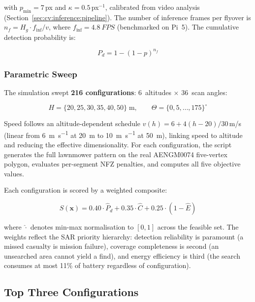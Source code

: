 \noindent with $p_{\mathrm{min}} = 7$\,px and $\kappa = 0.5$\,px$^{-1}$, calibrated from video analysis (Section~\ref{sec:cv:inference:pipeline}).
The number of inference frames per flyover is $n_f = H_g \cdot f_{\mathrm{inf}} / v$, where $f_{\mathrm{inf}} = \SI{4.8}{FPS}$ (benchmarked on Pi~5).
The cumulative detection probability is:

\begin{equation}\label{eq:opt-pdetect}
  P_d = 1 - (1 - p)^{n_f}
\end{equation}

\subsubsection{Parametric Sweep}

The simulation swept \textbf{216 configurations}: 6~altitudes $\times$ 36~scan angles:

\begin{equation}
  H = \{20, 25, 30, 35, 40, 50\}\;\text{m}, \qquad \Theta = \{0, 5, \ldots, 175\}^\circ
\end{equation}

\noindent Speed follows an altitude-dependent schedule $v(h) = 6 + 4(h-20)/30$\,m/s (linear from \SI{6}{\metre\per\second} at \SI{20}{\metre} to \SI{10}{\metre\per\second} at \SI{50}{\metre}), linking speed to altitude and reducing the effective dimensionality.
For each configuration, the script generates the full lawnmower pattern on the real AENGM0074 five-vertex polygon, evaluates per-segment NFZ penalties, and computes all five objective values.

Each configuration is scored by a weighted composite:

\begin{equation}\label{eq:opt-composite}
  S(\mathbf{x}) = 0.40 \cdot \hat{P}_d + 0.35 \cdot \hat{C} + 0.25 \cdot (1 - \hat{E})
\end{equation}

\noindent where $\hat{\cdot}$ denotes min-max normalisation to $[0,1]$ across the feasible set.
The weights reflect the SAR priority hierarchy: detection reliability is paramount (a missed casualty is mission failure), coverage completeness is second (an unsearched area cannot yield a find), and energy efficiency is third (the search consumes at most 11\% of battery regardless of configuration).

\subsection{Top Three Configurations}\label{sec:opt-top3}

